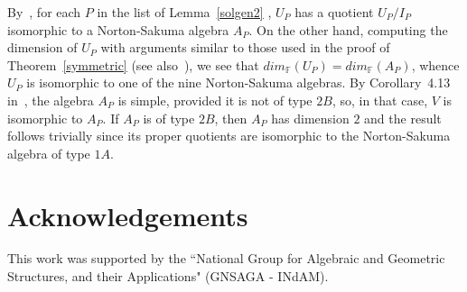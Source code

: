 \documentclass[a4paper]{amsart}
\newcommand{\F}{{\mathbb F}}
\begin{document}
By~\cite{IPSS10, HRS}, for each $P$ in the  list of Lemma~\ref{solgen2} , $U_{P}$ has a quotient $U_P/I_P$ isomorphic to a Norton-Sakuma algebra $A_P$. On the other hand, computing the dimension of $U_P$ with arguments similar to those used in the proof of Theorem~\ref{symmetric} (see also~\cite[Proof of Lemma 8.6]{HRS}), we see that  $dim_\F(U_P)=dim_\F(A_P)$, whence $U_P$ is isomorphic to one of the nine Norton-Sakuma algebras. 
By Corollary~4.13 in~\cite{KMS}, the algebra $A_P$ is simple, provided it is not of type $2B$, so, in that case, $V$ is isomorphic to $A_P$.  If $A_P$ is of type $2B$, then $A_P$ has dimension $2$ and the result follows trivially since its proper quotients are isomorphic to the Norton-Sakuma algebra of type $1A$.
\section{Acknowledgements}
This work was supported by the ``National Group for Algebraic and Geometric Structures, and their Applications" (GNSAGA - INdAM).
\end{document}
